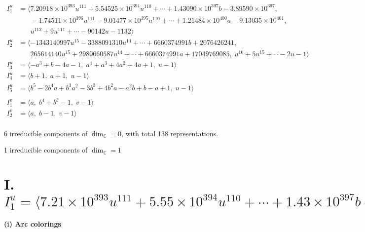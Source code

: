 \documentclass[1p]{elsarticle_modified}
\theoremstyle{definition}
\begin{document}
\begin{align*}
I^u_{1}&=\langle 
7.20918\times10^{393} u^{111}+5.54525\times10^{394} u^{110}+\cdots+1.43090\times10^{397} b-3.89590\times10^{397},\\
\phantom{I^u_{1}}&\phantom{= \langle  }-1.74511\times10^{396} u^{111}-9.01477\times10^{395} u^{110}+\cdots+1.21484\times10^{400} a-9.13035\times10^{401},\\
\phantom{I^u_{1}}&\phantom{= \langle  }u^{112}+9 u^{111}+\cdots-90142 u-1132\rangle \\
I^u_{2}&=\langle 
-1343140997 u^{15}-3388091310 u^{14}+\cdots+6660374991 b+2076426241,\\
\phantom{I^u_{2}}&\phantom{= \langle  }265614140 u^{15}+2980660587 u^{14}+\cdots+6660374991 a+17049769085,\;u^{16}+5 u^{15}+\cdots-2 u-1\rangle \\
I^u_{3}&=\langle 
- a^3+b-4 a-1,\;a^4+a^3+4 a^2+4 a+1,\;u-1\rangle \\
I^u_{4}&=\langle 
b+1,\;a+1,\;u-1\rangle \\
I^u_{5}&=\langle 
b^5-2 b^4 a+b^3 a^2-3 b^3+4 b^2 a- a^2 b+b- a+1,\;u-1\rangle \\
\\
I^v_{1}&=\langle 
a,\;b^4+b^3-1,\;v-1\rangle \\
I^v_{2}&=\langle 
a,\;b-1,\;v-1\rangle \\
\end{align*}
\raggedright * 6 irreducible components of $\dim_{\mathbb{C}}=0$, with total 138 representations.\\
\raggedright * 1 irreducible components of $\dim_{\mathbb{C}}=1$ \\
\newpage
\renewcommand{\arraystretch}{1}
\centering \section*{I. $I^u_{1}= \langle 7.21\times10^{393} u^{111}+5.55\times10^{394} u^{110}+\cdots+1.43\times10^{397} b-3.90\times10^{397},\;-1.75\times10^{396} u^{111}-9.01\times10^{395} u^{110}+\cdots+1.21\times10^{400} a-9.13\times10^{401},\;u^{112}+9 u^{111}+\cdots-90142 u-1132 \rangle$}
\flushleft \textbf{(i) Arc colorings}\\
\end{document}
